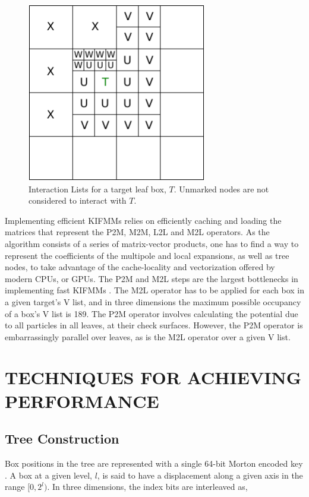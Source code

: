 \documentclass{IEEEcsmag}
\begin{document}
\begin{figure}
\centerline{\includegraphics[width=18.5pc]{figures/interaction_lists.pdf}}
\caption{Interaction Lists for a target leaf box, $T$. Unmarked nodes are not considered to interact with $T$.}
\label{fig:interaction_lists}
\end{figure}

Implementing efficient KIFMMs relies on efficiently caching and loading the matrices that represent the P2M, M2M, L2L and M2L operators. As the algorithm consists of a series of matrix-vector products, one has to find a way to represent the coefficients of the multipole and local expansions, as well as tree nodes, to take advantage of the cache-locality and vectorization offered by modern CPUs, or GPUs. The P2M and M2L steps are the largest bottlenecks in implementing fast KIFMMs \cite{Lashuk2012}. The M2L operator has to be applied for each box in a given target's V list, and in three dimensions the maximum possible occupancy of a box's V list is 189. The P2M operator involves calculating the potential due to all particles in all leaves, at their check surfaces. However, the P2M operator is embarrassingly parallel over leaves, as is the M2L operator over a given V list.

\section{TECHNIQUES FOR ACHIEVING PERFORMANCE}

\subsection{Tree Construction}

Box positions in the tree are represented with a single 64-bit Morton encoded key \cite{Sundar2007}. A box at a given level, $l$, is said to have a displacement along a given axis in the range $[0, 2^l)$. In three dimensions, the index bits are interleaved as,
\end{document}

